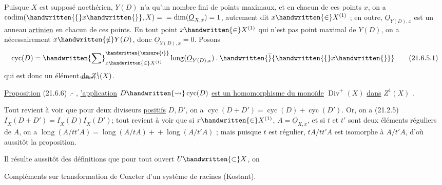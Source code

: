 Puisque $X$ est supposé noethérien, $Y(D)$ n'a qu'un nombre fini de points maximaux, et en chacun de ces points $x$, on a $\operatorname{codim}(\handwritten{\{}x\handwritten{\}},X)={}\allowbreak{}=\operatorname{dim}(\underline O_{X,x})=1$, autrement dit $x\handwritten{\in}X^{(1)}$ ;
\normalmarginpar
{} en outre, $\underline O_{Y(D),x}$ est un anneau \uline{artinien} en chacun de ces points. En tout point $x\handwritten{\in}X^{(1)}$ qui n'est pas point maximal de $Y(D)$, on a nécessairement $x\handwritten{\notin}Y(D)$, donc $\underline O_{Y(D),x}=0$. Posons
\[
  \operatorname{cyc}(D)=\handwritten{\sum}^{\handwritten{\unsure{\prime}}}_{x\handwritten{\in}X^{(1)}}
  \operatorname{long}(\underline O_{Y(D),x})\mathbin{.}\handwritten{\overline}{\handwritten{\{}x\handwritten{\}}}
  \tag*{(21.6.5.1)}
\]
qui est donc un élément de $Z^{1}\llap{\raisebox{-.12ex}[0pt][0pt]{\tiny\unsure{.}}}(X)$.

\uline{Proposition} (21.6.6) .- , \uline{'application} $D\handwritten{\leadsto}\operatorname{cyc}(D)$\deleted{\unsure{;}} \uline{est un homomorphisme du monoïde} $\operatorname{Div}^{+}(X)$ \uline{dans} $Z^{1}(X)$ .

Tout revient à voir que pour deux diviseurs \uline{positifs} $D,D'$, on a $\operatorname{cyc}(D+D')=\operatorname{cyc}(D)+\operatorname{cyc}(D')$. Or, on a (21.2.5) $\underline I_{X}(D+D')=\underline I_{X}(D)\underline I_{X}(D')$; tout revient à voir que si $x\handwritten{\in}X^{(1)}$,  $A=\underline O_{X,x}$, et si $t$ et $t'$ sont deux éléments réguliers de $A$, on a $\operatorname{long}(A/tt'A)=\operatorname{long}(A/tA)+{}\allowbreak{}+\operatorname{long}(A/t'A)$ ; mais puisque  $t$ est régulier, $tA/tt'A$ est isomorphe à $A/t'A$, d'où  aussitôt la proposition.

Il résulte aussitôt des définitions que pour tout ouvert $U\handwritten{\subset}X$, on

Compléments sur transformation de Coxeter d'un système de racines (Kostant).
\par\noindent\hspace*{1.5cm}

